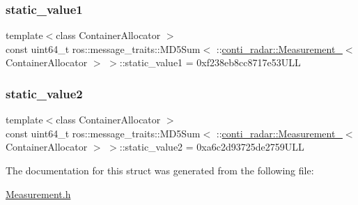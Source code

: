 \subsubsection{\texorpdfstring{static\+\_\+value1}{static\_value1}}
{\footnotesize\ttfamily template$<$class Container\+Allocator $>$ \\
const uint64\+\_\+t ros\+::message\+\_\+traits\+::\+M\+D5\+Sum$<$ \+::\hyperlink{structconti__radar_1_1Measurement__}{conti\+\_\+radar\+::\+Measurement\+\_\+}$<$ Container\+Allocator $>$ $>$\+::static\+\_\+value1 = 0xf238eb8cc8717e53\+U\+LL\hspace{0.3cm}{\ttfamily [static]}}

\mbox{\label{structros_1_1message__traits_1_1MD5Sum_3_01_1_1conti__radar_1_1Measurement___3_01ContainerAllocator_01_4_01_4_a7e1448dc7c16de9bf3444ba27d2d1e4d}} 
\subsubsection{\texorpdfstring{static\+\_\+value2}{static\_value2}}
{\footnotesize\ttfamily template$<$class Container\+Allocator $>$ \\
const uint64\+\_\+t ros\+::message\+\_\+traits\+::\+M\+D5\+Sum$<$ \+::\hyperlink{structconti__radar_1_1Measurement__}{conti\+\_\+radar\+::\+Measurement\+\_\+}$<$ Container\+Allocator $>$ $>$\+::static\+\_\+value2 = 0xa6c2d93725de2759\+U\+LL\hspace{0.3cm}{\ttfamily [static]}}



The documentation for this struct was generated from the following file\+:\begin{DoxyCompactItemize}
\item 
\hyperlink{Measurement_8h}{Measurement.\+h}\end{DoxyCompactItemize}
